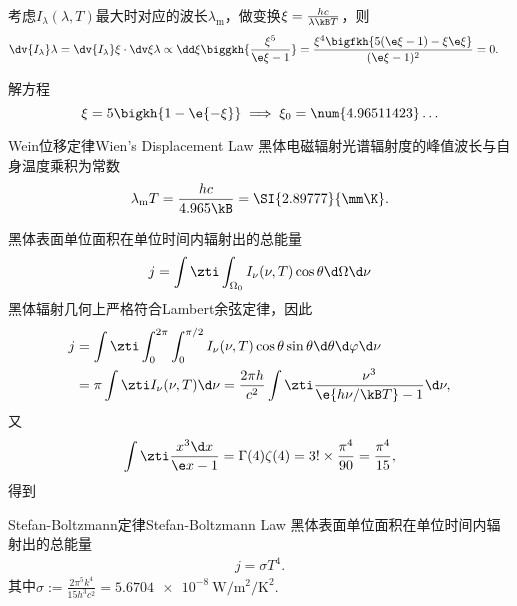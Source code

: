 考虑$I_\lambda(\lambda,T)$最大时对应的波长$\lambda_{\mathrm m}$，做变换$\xi=\frac{hc}{\lambda\kB T}$，则
\begin{align*}
	\dv{I_\lambda}\lambda & =\dv{I_\lambda}\xi\cdot\dv\xi\lambda\propto\dd\xi\biggkh{\frac{\xi^5}{\e\xi-1}}
	=\frac{\xi^4\bigfkh{5(\e\xi-1)-\xi\e\xi}}{(\e\xi-1)^2}=0.
\end{align*}
\iffalse
	\[
		\dv{I_\lambda}\lambda=\frac c4\cdot\frac{8\pi}{3c^3}\cdot\dd\lambda\kh{\frac{h\nu}{\e{h\nu/\kB T}-1}\cdot\dd\lambda\nu^3}.
	\]
	由
	\[
		\dd\lambda=\dd\nu\cdot\dv\nu\lambda=-\frac c{\lambda^2}\dd\nu=-\frac{\nu^2}c\dd\nu.
	\]
	故
	\begin{align*}
		\dv r\lambda&=\frac{2h}{3c^2}\cdot\frac{\nu^2}{c}\cdot\dd\nu\kh{\frac{\nu}{\e{h\nu/\kB T}-1}\cdot\frac{\nu^2}c\cdot 3\nu^2}\\
		&=\frac{2h\nu^2}{c^4}\cdot\dd\nu\frac{\nu^5}{\e{h\nu/\kB T}-1},
	\end{align*}
	设$\xi:=h\nu/\kB T$，则导数等价于
	\[
		\dd\xi\frac{\xi^5}{\e\xi-1}=\frac{\xi^4}{\kh{\e\xi-1}^2}\fkh{5\kh{\e\xi-1}-\xi\e\xi}=0.
\]
\fi
解方程
\[
	\xi=5\bigkh{1-\e{-\xi}}\implies\xi_0=\num{4.96511423}\ldots
\]
\begin{theorem}{Wein位移定律}{Wien's Displacement Law}
	黑体电磁辐射光谱辐射度的峰值波长与自身温度乘积为常数
	\begin{align}
		\lambda_\mathrm m T=\frac{hc}{4.965\kB}=\SI{2.89777}{\mm\K}.
	\end{align}
\end{theorem}
\iffalse
	let $x:=\frac{\lambda kT}{hc}$, then $\d\lambda=\frac{hc}{kT}\d x,\frac{2\pi hc^2}{\lambda^5}=\frac{2\pi k^5T^5}{h^4c^3}\frac1{x^5}$
	\begin{align*}
		\frac{\d r}{\d\lambda} & =\frac{kT}{hc}\frac{2\pi k^5T^5}{h^4c^3}\frac{\d}{\d x}\frac1{x^5(e^{1/x}-1)}     \\
		                       & =\frac{2\pi k^6T^6}{h^5c^4}\frac{5x^4(e^{1/x}-1)+x^3e^{1/x}}{x^{10}(e^{1/x}-1)^2} \\
		                       & =\frac{2\pi k^6T^6}{h^5c^4}\frac{5xe^{1/x}-5x+e^{1/x}}{x^7(e^{1/x}-1)^2}
	\end{align*}
\fi
黑体表面单位面积在单位时间内辐射出的总能量
\[
	j=\int\zti\int_{\Omega_0}I_\nu(\nu,T)\cos\theta\d\Omega\d\nu
\]
黑体辐射几何上严格符合Lambert余弦定律，因此
\begin{align*}
	j & =\int\zti\int_0^{2\pi}\int_0^{\pi/2}I_\nu(\nu,T)\cos\theta\sin\theta\d\theta\d\varphi\d\nu \\
	  & =\pi\int\zti I_\nu(\nu,T)\d\nu=\frac{2\pi h}{c^2}\int\zti\frac{\nu^3}{\e{h\nu/\kB T}-1}\d\nu,
\end{align*}
又
\[
	\int\zti\frac{x^3\d x}{\e x-1}=\Gamma(4)\zeta(4)=3!\times\frac{\pi^4}{90}=\frac{\pi^4}{15},
\]
得到
\begin{theorem}{Stefan-Boltzmann定律}{Stefan-Boltzmann Law}
	黑体表面单位面积在单位时间内辐射出的总能量
	\begin{align}
		j=\sigma T^4.
	\end{align}
	其中$\sigma:=\frac{2\pi^5k^4}{15h^3c^2}=\SI{5.6704e-8}{\W\per\m\squared\per\K\squared}.$
\end{theorem}

